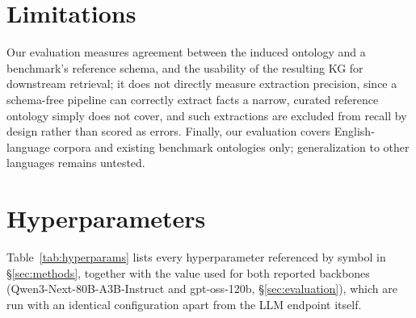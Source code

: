 \documentclass[11pt]{article}
\begin{document}
\section*{Limitations}

Our evaluation measures agreement between the induced ontology and a benchmark's reference schema, and the usability of the resulting KG for downstream retrieval; it does not directly measure extraction precision, since a schema-free pipeline can correctly extract facts a narrow, curated reference ontology simply does not cover, and such extractions are excluded from recall by design rather than scored as errors. Finally, our evaluation covers English-language corpora and existing benchmark ontologies only; generalization to other languages remains untested.




\newpage
\appendix

\section{Hyperparameters}
\label{sec:appendix-hyperparams}

Table~\ref{tab:hyperparams} lists every hyperparameter referenced by symbol in \S\ref{sec:methods}, together with the value used for both reported backbones (Qwen3-Next-80B-A3B-Instruct and gpt-oss-120b, \S\ref{sec:evaluation}), which are run with an identical configuration apart from the LLM endpoint itself.
\end{document}

